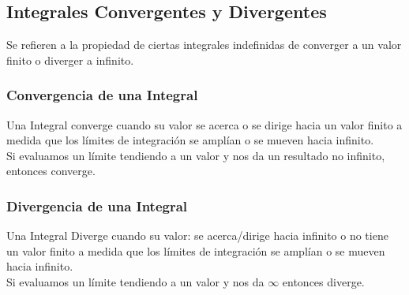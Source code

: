 \documentclass[10pt,a4paper]{article}
\begin{document}
\subsection*{Integrales Convergentes y Divergentes}
Se refieren a la propiedad de ciertas integrales indefinidas de converger a un valor finito o diverger a infinito. \\
\subsubsection*{Convergencia de una Integral}
Una Integral converge cuando su valor se acerca o se dirige hacia un valor finito a medida que los límites de integración se amplían o se mueven hacia infinito. \\
Si evaluamos un límite tendiendo a un valor y nos da un resultado no infinito, entonces converge. 
\subsubsection*{Divergencia de una Integral}
Una Integral Diverge cuando su valor: se acerca/dirige hacia infinito o no tiene un valor finito a medida que los límites de integración se amplían o se mueven hacia infinito. \\
Si evaluamos un límite tendiendo a un valor y nos da $\infty$ entonces diverge.  
\end{document}
